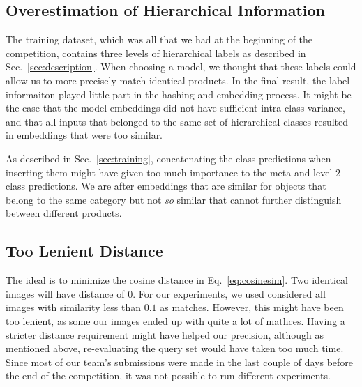 \documentclass[conference]{IEEEtran}
\begin{document}
\subsection{Overestimation of Hierarchical Information}
The training dataset, which was all that we had at the beginning of the competition,
contains three levels of hierarchical labels as described in Sec.~\ref{sec:description}.
When choosing a model, we thought that these labels could allow us to more precisely match
identical products.
In the final result, the label informaiton played little part in the hashing and embedding process.
It might be the case that the model embeddings did not have sufficient intra-class variance, 
and that all inputs that belonged to the same set of hierarchical classes resulted in embeddings that were too 
similar.

As described in Sec.~\ref{sec:training}, concatenating the class predictions when inserting them
might have given  too much importance to the meta and level 2 class predictions.
We are after embeddings that are similar for objects that belong to the same category but not
\emph{so} similar that cannot further distinguish between different products.

\subsection{Too Lenient Distance}
The ideal is to minimize the cosine distance in Eq.~\ref{eq:cosinesim}.
Two identical images will have distance of $0$.
For our experiments, we used considered all images with similarity less than 
$0.1$ as matches.
However, this might have been too lenient, as some our images ended up with quite 
a lot of mathces.
Having a stricter distance requirement might have helped our precision, although as 
mentioned above, re-evaluating the query set would have taken too much time.
Since most of our team's submissions were made in the last couple of days before the 
end of the competition, it was not possible to run different experiments.
\end{document}

